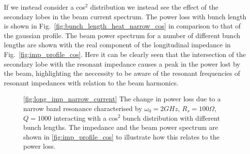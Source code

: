 If we instead consider a cos$^{2}$ distribution we instead see the effect of the secondary lobes in the beam current spectrum. The power loss with bunch length is shown in Fig.~\ref{fig:bunch_length_heat_narrow_cos} in comparison to that of the gaussian profile. The beam power spectrum for a number of different bunch lengths are shown with the real component of the longitudinal impedance in Fig.~\ref{fig:imp_profile_cos}. Here it can be clearly seen that the intersection of the secondary lobe with the resonant impedance causes a peak in the power lost by the beam, highlighting the neccessity to be aware of the resonant frequencies of resonant impedances with relation to the beam harmonics.


\begin{figure}
\caption{\ref{fig:long_imp_narrow_current} The change in power loss due to a narrow band resonance characterised by $\omega_{0} = 2GHz$, $R_{s} = 100\Omega$, $Q = 1000$ interacting with a cos$^{2}$ bunch distribution with different bunch lengths. The impedance and the beam power spectrum are shown in \ref{fig:imp_profile_cos} to illustrate how this relates to the power loss.}
\end{figure}

